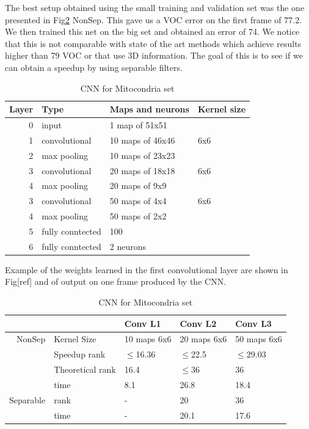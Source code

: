 The best setup obtained using the small training and validation set was the one presented in Fig\ref{fig:CNN3} NonSep. This gave us a VOC error on the first frame of 77.2. We then trained this net on the big set and obtained an error of 74. We notice that this is not comparable with state of the art methods which achieve results higher than 79 VOC or that use 3D information. The goal of this
is to see if we can obtain a speedup by using separable filters.
\begin{table}
\centering
\begin{tabular}{@{}rlll@{}}\toprule
Layer & Type & Maps and neurons& Kernel size \\ \midrule
0 & input & 1 map of 51x51 &\\
1& convolutional & 10 maps of 46x46 & 6x6\\
2 & max pooling & 10 maps of 23x23 &  \\
3 & convolutional & 20 maps of 18x18& 6x6 \\
4 & max pooling & 20 maps of 9x9& \\ 
3 & convolutional & 50 maps of 4x4& 6x6 \\
4 & max pooling & 50 maps of 2x2& \\ 
5 & fully conntected& 100 & \\
6 & fully conntected & 2 neurons & \\ \bottomrule
\end{tabular}
\caption{CNN for Mitocondria set}
\label{fig:CNN3}
\end{table}
Example of the weights learned in the first convolutional layer are shown in Fig[ref] and of output on one frame produced by the CNN. 
\begin{table}
\centering
\begin{tabular}{@{}rllll@{}}\toprule
 &&Conv L1& Conv L2 & Conv L3\\ \midrule
NonSep &Kernel Size & 10 maps 6x6& 20 maps 6x6 & 50 maps 6x6\\
&Speedup rank& $\leq$16.36 & $\leq$22.5 & $\leq$29.03\\
&Theoretical rank & 16.4 & $\leq$36 & 36 \\ 
&time & 8.1 & 26.8 & 18.4 \\ \midrule
Separable& rank & - & 20 & 36 \\ 
& time& - & 20.1 & 17.6\\ \midrule
\end{tabular}
\caption{CNN for Mitocondria set}
\label{fig:CNN3}
\end{table}
